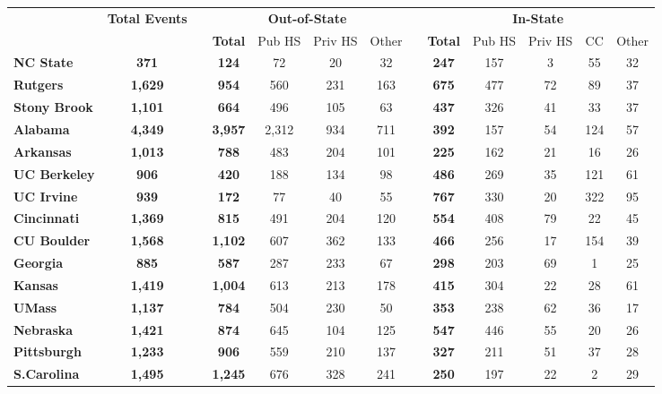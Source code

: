 \begin{tabular*}{\textwidth}{@{\extracolsep{\fill} } lcccccccccccc}%
&\bfseries Total Events&&\multicolumn{4}{c}{\bfseries Out-of-State}&&\multicolumn{5}{c}{\bfseries In-State}\\%
&&&\bfseries Total&Pub HS&Priv HS&Other&&\bfseries Total&Pub HS&Priv HS&CC&Other\\%
\hline%
\bfseries NC State&\bfseries 371&&\bfseries 124&72&20&32&&\bfseries 247&157&3&55&32\\%
\bfseries Rutgers&\bfseries 1,629&&\bfseries 954&560&231&163&&\bfseries 675&477&72&89&37\\%
\bfseries Stony Brook&\bfseries 1,101&&\bfseries 664&496&105&63&&\bfseries 437&326&41&33&37\\%
\bfseries Alabama&\bfseries 4,349&&\bfseries 3,957&2,312&934&711&&\bfseries 392&157&54&124&57\\%
\bfseries Arkansas&\bfseries 1,013&&\bfseries 788&483&204&101&&\bfseries 225&162&21&16&26\\%
\bfseries UC Berkeley&\bfseries 906&&\bfseries 420&188&134&98&&\bfseries 486&269&35&121&61\\%
\bfseries UC Irvine&\bfseries 939&&\bfseries 172&77&40&55&&\bfseries 767&330&20&322&95\\%
\bfseries Cincinnati&\bfseries 1,369&&\bfseries 815&491&204&120&&\bfseries 554&408&79&22&45\\%
\bfseries CU Boulder&\bfseries 1,568&&\bfseries 1,102&607&362&133&&\bfseries 466&256&17&154&39\\%
\bfseries Georgia&\bfseries 885&&\bfseries 587&287&233&67&&\bfseries 298&203&69&1&25\\%
\bfseries Kansas&\bfseries 1,419&&\bfseries 1,004&613&213&178&&\bfseries 415&304&22&28&61\\%
\bfseries UMass&\bfseries 1,137&&\bfseries 784&504&230&50&&\bfseries 353&238&62&36&17\\%
\bfseries Nebraska&\bfseries 1,421&&\bfseries 874&645&104&125&&\bfseries 547&446&55&20&26\\%
\bfseries Pittsburgh&\bfseries 1,233&&\bfseries 906&559&210&137&&\bfseries 327&211&51&37&28\\%
\bfseries S.Carolina&\bfseries 1,495&&\bfseries 1,245&676&328&241&&\bfseries 250&197&22&2&29\\%
\hline%
\end{tabular*}